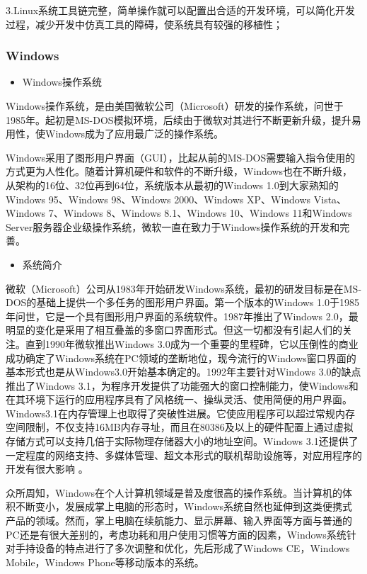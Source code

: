 \documentclass[
]{article}
\begin{document}
3.Linux系统工具链完整，简单操作就可以配置出合适的开发环境，可以简化开发过程，减少开发中仿真工具的障碍，使系统具有较强的移植性；

\hypertarget{windows}{%
\subsubsection{Windows}\label{windows}}

\begin{itemize}
\item
  Windows操作系统
\end{itemize}

Windows操作系统，是由美国微软公司（Microsoft）研发的操作系统，问世于1985年。起初是MS-DOS模拟环境，后续由于微软对其进行不断更新升级，提升易用性，使Windows成为了应用最广泛的操作系统。

Windows采用了图形用户界面（GUI），比起从前的MS-DOS需要输入指令使用的方式更为人性化。随着计算机硬件和软件的不断升级，Windows也在不断升级，从架构的16位、32位再到64位，系统版本从最初的Windows
1.0到大家熟知的Windows 95、Windows 98、Windows 2000、Windows XP、Windows
Vista、Windows 7、Windows 8、Windows 8.1、Windows 10、Windows
11和Windows
Server服务器企业级操作系统，微软一直在致力于Windows操作系统的开发和完善。

\begin{itemize}
\item
  系统简介
\end{itemize}

微软（Microsoft）公司从1983年开始研发Windows系统，最初的研发目标是在MS-DOS的基础上提供一个多任务的图形用户界面。第一个版本的Windows
1.0于1985年问世，它是一个具有图形用户界面的系统软件。1987年推出了Windows
2.0，最明显的变化是采用了相互叠盖的多窗口界面形式。但这一切都没有引起人们的关注。直到1990年微软推出Windows
3.0成为一个重要的里程碑，它以压倒性的商业成功确定了Windows系统在PC领域的垄断地位，现今流行的Windows窗口界面的基本形式也是从Windows3.0开始基本确定的。1992年主要针对Windows
3.0的缺点推出了Windows
3.1，为程序开发提供了功能强大的窗口控制能力，使Windows和在其环境下运行的应用程序具有了风格统一、操纵灵活、使用简便的用户界面。Windows3.1在内存管理上也取得了突破性进展。它使应用程序可以超过常规内存空间限制，不仅支持16MB内存寻址，而且在80386及以上的硬件配置上通过虚拟存储方式可以支持几倍于实际物理存储器大小的地址空间。Windows
3.1还提供了一定程度的网络支持、多媒体管理、超文本形式的联机帮助设施等，对应用程序的开发有很大影响
。

众所周知，Windows在个人计算机领域是普及度很高的操作系统。当计算机的体积不断变小，发展成掌上电脑的形态时，Windows系统自然也延伸到这类便携式产品的领域。然而，掌上电脑在续航能力、显示屏幕、输入界面等方面与普通的PC还是有很大差别的，考虑功耗和用户使用习惯等方面的因素，Windows系统针对手持设备的特点进行了多次调整和优化，先后形成了Windows
CE，Windows Mobile，Windows Phone等移动版本的系统。
\end{document}

